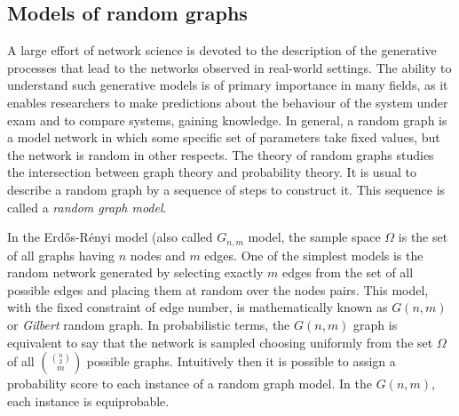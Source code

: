 
\subsection{Models of random graphs}\label{sec:models_random_graph}
A large effort of network science is devoted to the description of the generative processes that lead to the networks observed in real-world settings.
The ability to understand such generative models is of primary importance in many fields, as it enables researchers to make predictions about the behaviour of the system under exam and to compare systems, gaining knowledge.
In general, a random graph is a model network in which some specific set of parameters take fixed values, but the network is random in other respects.
The theory of random graphs studies the intersection between graph theory and probability theory.
It is usual to describe a random graph by a sequence of steps to construct it. This sequence is called a \emph{random graph model}.

In the Erd\H{o}s-Rényi model (also called $G_{n,m}$ model, the sample space $\Omega$ is the set of all graphs having $n$ nodes and $m$ edges.
One of the simplest models is the random network generated by selecting exactly $m$ edges from the set of all possible edges and placing them at random over the nodes pairs.
This model, with the fixed constraint of edge number, is mathematically known as $G(n,m)$ or \emph{Gilbert} random graph.
In probabilistic terms, the $G(n,m)$ graph is equivalent to say that the network is sampled choosing uniformly from the set $\Omega$ of all $\binom{\binom{n}{2}}{m}$ possible graphs.
Intuitively then it is possible to assign a probability score to each instance of a random graph model.
In the $G(n,m)$, each instance is equiprobable.

